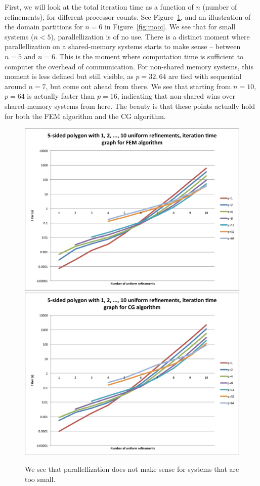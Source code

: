 \documentclass[11pt]{amsart}
\theoremstyle{definition}
\begin{document}
First, we will look at the total iteration time as a function of $n$ (number of refinements), for different processor counts. See Figure~\ref{fig:times}, and an illustration of the domain partitions for $n=6$ in Figure~\ref{fig:mooi}. We see that for small systems ($n < 5$), parallellization is of no use. There is a distinct moment where parallellization on a shared-memory systems starts to make sense -- between $n=5$ and $n=6$. This is the moment where computation time is sufficient to computer the overhead of communication. For non-shared memory systems, this moment is less defined but still visible, as $p=32,64$ are tied with sequential around $n=7$, but come out ahead from there. We see that starting from $n=10$, $p=64$ is actually faster than $p=16$, indicating that non-shared wins over shared-memory systems from here. The beauty is that these points actually hold for both the FEM algorithm and the CG algorithm.
\begin{figure}
  \includegraphics[width=0.8\linewidth]{times_fem.pdf}
  \includegraphics[width=0.8\linewidth]{times_cg.pdf}
  \caption{We see that parallellization does not make sense for systems that are too small.}
  \label{fig:times}
\end{figure}
\end{document}
